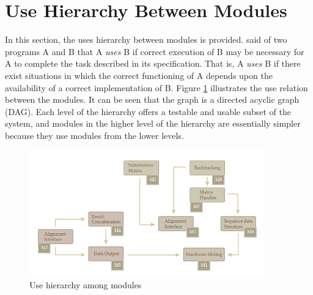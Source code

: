 \documentclass[12pt, titlepage]{article}
\begin{document}
\section{Use Hierarchy Between Modules} \label{SecUse}

In this section, the uses hierarchy between modules is
provided. \citet{Parnas1978} said of two programs A and B that A {\em uses} B if
correct execution of B may be necessary for A to complete the task described in
its specification. That is, A {\em uses} B if there exist situations in which
the correct functioning of A depends upon the availability of a correct
implementation of B.  Figure \ref{FigUH} illustrates the use relation between
the modules. It can be seen that the graph is a directed acyclic graph
(DAG). Each level of the hierarchy offers a testable and usable subset of the
system, and modules in the higher level of the hierarchy are essentially simpler
because they use modules from the lower levels.



\begin{figure}[H]
\centering
\includegraphics[width=0.9\textwidth]{module_inter.png}
\caption{Use hierarchy among modules}
\label{FigUH}
\end{figure}

\end{document}
